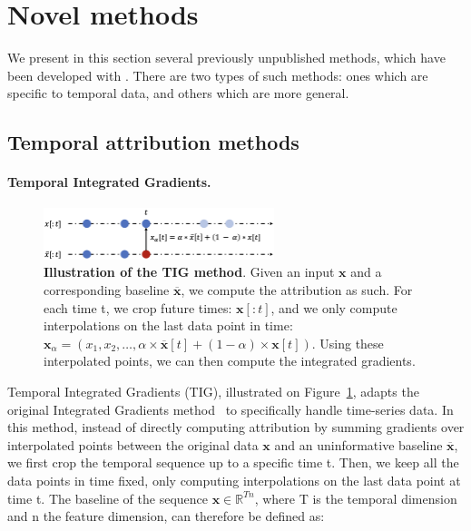 \section{Novel methods}
\label{sec:methods}

We present in this section several previously unpublished methods, which have been developed
with \texttt{}.
There are two types of such methods: ones which are specific to temporal data, and others which are more general.


\subsection{Temporal attribution methods}
\label{subsec:temporal-attribution-methods}

\paragraph{Temporal Integrated Gradients.}

\begin{figure}[h]
\begin{center}
\centerline{\includegraphics[width=0.6\textwidth]{figures/tig}}
\caption{
    \textbf{Illustration of the TIG method}.
    Given an input $\textbf{x}$ and a corresponding baseline $\overline{\textbf{x}}$, we compute the attribution as such.
    For each time t, we crop future times: $\textbf{x}[:t]$, and we only compute interpolations on the last data point in
    time: $\textbf{x}_{\alpha} = (x_1, x_2, \dots, \alpha \times \overline{\textbf{x}}[t] + (1 - \alpha) \times \textbf{x}[t])$.
    Using these interpolated points, we can then compute the integrated gradients.
}
\label{fig:tig}
\end{center}
\end{figure}

Temporal Integrated Gradients (TIG), illustrated on Figure~\ref{fig:tig}, adapts the original Integrated Gradients
method~\citep{sundararajan2017axiomatic} to specifically handle time-series data.
In this method, instead of directly computing attribution by summing gradients over interpolated points between the
original data $\textbf{x}$ and an uninformative baseline $\overline{\textbf{x}}$, we first crop the temporal sequence up
to a specific time t.
Then, we keep all the data points in time fixed, only computing interpolations on the last data point at time t.
The baseline of the sequence $\textbf{x} \in \mathbb{R}^{Tn}$, where T is the temporal dimension and n the
feature dimension, can therefore be defined as:


